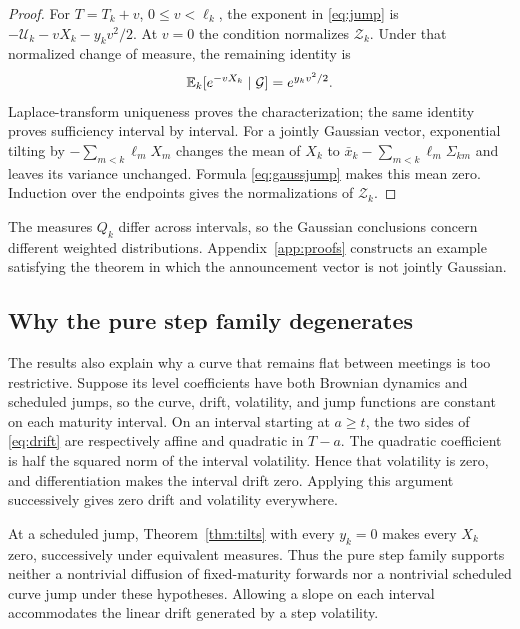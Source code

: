 \begin{proof}
For $T=T_k+v$, $0\le v<\ell_k$, the exponent in \eqref{eq:jump} is $-\mathcal U_k-vX_k-y_kv^2/2$. At $v=0$ the condition normalizes $\mathcal Z_k$. Under that normalized change of measure, the remaining identity is
\[
\mathbb E_k[e^{-vX_k}\mid\mathcal G]=e^{y_kv^2/2}.
\]
Laplace-transform uniqueness proves the characterization; the same identity proves sufficiency interval by interval. For a jointly Gaussian vector, exponential tilting by $-\sum_{m<k}\ell_mX_m$ changes the mean of $X_k$ to $\bar x_k-\sum_{m<k}\ell_m\Sigma_{km}$ and leaves its variance unchanged. Formula \eqref{eq:gaussjump} makes this mean zero. Induction over the endpoints gives the normalizations of $\mathcal Z_k$.
\end{proof}

The measures $Q_k$ differ across intervals, so the Gaussian conclusions concern different weighted distributions. Appendix~\ref{app:proofs} constructs an example satisfying the theorem in which the announcement vector is not jointly Gaussian.

\subsection{Why the pure step family degenerates}
The results also explain why a curve that remains flat between meetings is too restrictive. Suppose its level coefficients have both Brownian dynamics and scheduled jumps, so the curve, drift, volatility, and jump functions are constant on each maturity interval. On an interval starting at $a\ge t$, the two sides of \eqref{eq:drift} are respectively affine and quadratic in $T-a$. The quadratic coefficient is half the squared norm of the interval volatility. Hence that volatility is zero, and differentiation makes the interval drift zero. Applying this argument successively gives zero drift and volatility everywhere.

At a scheduled jump, Theorem~\ref{thm:tilts} with every $y_k=0$ makes every $X_k$ zero, successively under equivalent measures. Thus the pure step family supports neither a nontrivial diffusion of fixed-maturity forwards nor a nontrivial scheduled curve jump under these hypotheses. Allowing a slope on each interval accommodates the linear drift generated by a step volatility.


